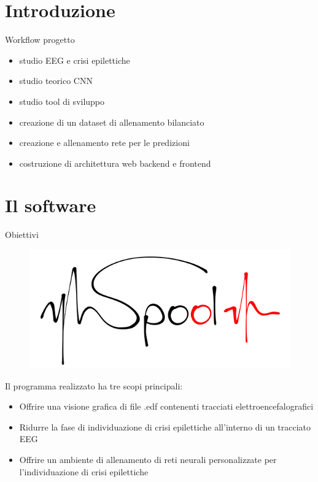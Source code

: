 \documentclass[xcolor=x11names,compress, 
					handout %
]{beamer}
\theoremstyle{definition} \newtheorem{esempio}{Esempio}
\theoremstyle{definition}
\begin{document}
\section{Introduzione}
	\begin{frame}{Workflow progetto}
		\begin{itemize}
			\item studio EEG e crisi epilettiche\pause
			\item studio teorico CNN\pause
			\item studio tool di sviluppo\pause
			\item creazione di un dataset di allenamento bilanciato\pause
			\item creazione e allenamento rete per le predizioni\pause
			\item costruzione di architettura web backend e frontend
		\end{itemize}
	\end{frame}


\section{Il software}

		\begin{frame}{Obiettivi}
			\begin{figure}
				\includegraphics[scale=0.3]{immagini/prova3-piccolo}
			\end{figure}
			
			Il programma realizzato ha tre scopi principali:\pause
			\begin{itemize}
				\item Offrire una visione grafica di file .edf contenenti tracciati elettroencefalografici \pause
				\item Ridurre la fase di individuazione di crisi epilettiche all'interno di un tracciato EEG \pause
				\item Offrire un ambiente di allenamento di reti neurali personalizzate per l'individuazione di crisi epilettiche
			\end{itemize}
		\end{frame}
		
\end{document}
